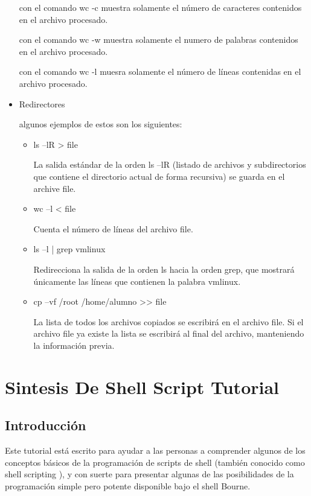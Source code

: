 \documentclass{article}
\begin{document}
\begin{itemize}
con el comando wc -c muestra solamente el número de caracteres contenidos en el archivo procesado.

con el comando wc -w muestra solamente el numero de palabras contenidos en el archivo procesado.
 
con el comando wc -l muesra solamente el número de líneas contenidas en el archivo procesado.

\item{Redirectores}


algunos ejemplos de estos son los siguientes:

\begin{itemize}
\item 

ls –lR > file

La salida estándar de la orden ls –lR (listado de archivos y
subdirectorios que contiene el directorio actual de forma recursiva)
se guarda en el archive file.

\item
wc –l < file

Cuenta el número de líneas del archivo file. 

\item
ls –l | grep vmlinux


Redirecciona la salida de la orden ls hacia la orden grep, que
mostrará únicamente las líneas que contienen la palabra vmlinux.

\item
cp –vf /root /home/alumno >> file


La lista de todos los archivos copiados se escribirá en el archivo file.
Si el archivo file ya existe la lista se escribirá al final del archivo,
manteniendo la información previa. 

\end{itemize}


\end{itemize}


\section{Sintesis De Shell Script Tutorial}
\subsection{Introducción}

Este tutorial está escrito para ayudar a las personas a comprender algunos de los conceptos básicos de la programación de scripts de shell (también conocido como shell scripting ), y con suerte para presentar algunas de las posibilidades de la programación simple pero potente disponible bajo el shell Bourne.
\end{document}
